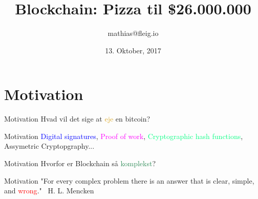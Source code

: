 \documentclass[usenames, dvipsnames]{beamer}
\title{Blockchain: Pizza til \hsout{\$21.000.000} \$26.000.000}
\date{13. Oktober, 2017}
\author{mathias@fleig.io}
\institute{Datalogisk Institut \\ Københavns Universitet}
\begin{document}
  \maketitle
  \section{Motivation}
  \begin{frame}{Motivation}
    \center Hvad vil det sige at \textcolor{Goldenrod}{eje} en bitcoin?
  \end{frame}
  \begin{frame}{Motivation}
    \center \textcolor{blue}{Digital signatures}, \textcolor{Magenta}{Proof of work}, \center \textcolor{SpringGreen}{Cryptographic hash functions}, Assymetric Cryptopgraphy...
  \end{frame}
  \begin{frame}{Motivation}
    \center Hvorfor er Blockchain så \textcolor{SeaGreen}{komplekst}?
  \end{frame}
  \begin{frame}{Motivation}
      \center "For every complex problem there is an answer that is clear,
			   simple, and \textcolor{red}{wrong}." \textemdash \ H. L. Mencken
  \end{frame}
\end{document}
